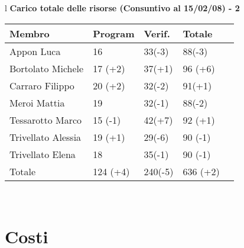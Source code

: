 \begin{table}[hbtp]
\large{
\begin{tabular}{l}
\Large{\textbf{\textsf{Carico totale delle risorse (Consuntivo al 15/02/08) - 2}}} \\

\begin{tabular}{||p{3.5cm}||p{2cm}||p{2cm}||p{2cm}||p{2cm}||}
\hline
\textbf{Membro} & \textbf{Program} & \textbf{Verif.} & \textbf{Totale}\\
\hline
{Appon Luca}&16&33\footnotesize{(-3)}&88\footnotesize{(-3)} \\ 
\hline 
{Bortolato Michele} &17 \footnotesize{(+2)}&37\footnotesize{(+1)}&96 \footnotesize{(+6)}\\ 
\hline
{Carraro Filippo}&20 \footnotesize{(+2)}&32\footnotesize{(-2)}&91\footnotesize{(+1)} \\
\hline
{Meroi Mattia}&19&32\footnotesize{(-1)}&88\footnotesize{(-2)}\\
\hline
{Tessarotto Marco} &15 \footnotesize{(-1)}&42\footnotesize{(+7)}&92 \footnotesize{(+1)}\\
\hline
{Trivellato Alessia} &19 \footnotesize{(+1)}&29\footnotesize{(-6)}&90 \footnotesize{(-1)} \\
\hline
{Trivellato Elena} &18&35\footnotesize{(-1)}&90 \footnotesize{(-1)} \\
\hline
{Totale} &124 \footnotesize{(+4)}&240\footnotesize{(-5)}&636 \footnotesize{(+2)} \\
\hline

\end{tabular} \\
\end{tabular}
}
\end{table}


\chapter{Costi}
